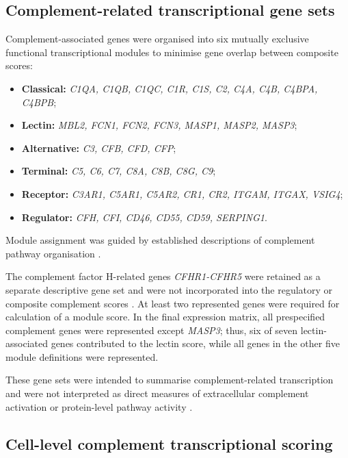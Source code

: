 \documentclass[10pt,letterpaper]{article}
\begin{document}
\subsection*{Complement-related transcriptional gene sets}

Complement-associated genes were organised into six mutually exclusive functional transcriptional modules to minimise gene overlap between composite scores:

\begin{itemize}
\item \textbf{Classical:} \textit{C1QA, C1QB, C1QC, C1R, C1S, C2, C4A, C4B, C4BPA, C4BPB};
\item \textbf{Lectin:} \textit{MBL2, FCN1, FCN2, FCN3, MASP1, MASP2, MASP3};
\item \textbf{Alternative:} \textit{C3, CFB, CFD, CFP};
\item \textbf{Terminal:} \textit{C5, C6, C7, C8A, C8B, C8G, C9};
\item \textbf{Receptor:} \textit{C3AR1, C5AR1, C5AR2, CR1, CR2, ITGAM, ITGAX, VSIG4};
\item \textbf{Regulator:} \textit{CFH, CFI, CD46, CD55, CD59, SERPING1}.
\end{itemize}

Module assignment was guided by established descriptions of complement pathway organisation \cite{merleComplementSystemPart2015, merleComplementSystemPart2015a, thurmanComplementKidneyOverview2020a}.

The complement factor H-related genes \textit{CFHR1-CFHR5} were retained as a separate descriptive gene set and were not incorporated into the regulatory or composite complement scores \cite{ferreiraComplementControlProtein2010a}. At least two represented genes were required for calculation of a module score. In the final expression matrix, all prespecified complement genes were represented except \textit{MASP3}; thus, six of seven lectin-associated genes contributed to the lectin score, while all genes in the other five module definitions were represented.

These gene sets were intended to summarise complement-related transcription and were not interpreted as direct measures of extracellular complement activation or protein-level pathway activity \cite{westComplosomeIntracellularComplement2023}.

\subsection*{Cell-level complement transcriptional scoring}
\end{document}
